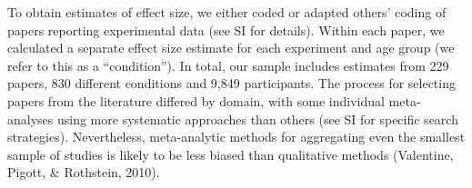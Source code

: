 \documentclass[english,floatsintext,man]{apa6}
\begin{document}
To obtain estimates of effect size, we either coded or adapted others'
coding of papers reporting experimental data (see SI for details).
Within each paper, we calculated a separate effect size estimate for
each experiment and age group (we refer to this as a
\enquote{condition}). In total, our sample includes estimates from 229
papers, 830 different conditions and 9,849 participants. The process for
selecting papers from the literature differed by domain, with some
individual meta-analyses using more systematic approaches than others
(see SI for specific search strategies). Nevertheless, meta-analytic
methods for aggregating even the smallest sample of studies is likely to
be less biased than qualitative methods (Valentine, Pigott, \&
Rothstein, 2010).

\renewcommand{\arraystretch}{1.5}
\end{document}
